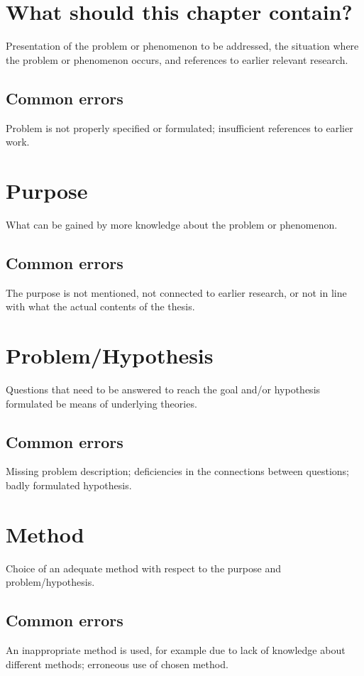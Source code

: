     \section{What should this chapter contain?}
    Presentation of the problem or phenomenon to be addressed, the situation where the problem or phenomenon occurs, and references to earlier relevant research. 
    \subsection{Common errors}
    Problem is not properly specified or formulated; insufficient references to earlier work.  
    
    \section{Purpose}
    What can be gained by more knowledge about the problem or phenomenon. 
    \subsection{Common errors}
    The purpose is not mentioned, not connected to earlier research, or not in line with what the actual contents of the thesis.  
    
    \section{Problem/Hypothesis} 
    Questions that need to be answered to reach 
    the goal and/or hypothesis formulated be means of 
    underlying theories. 
    \subsection{Common errors}
    Missing problem description; deficiencies in the connections between questions; badly formulated 
    hypothesis.  
    
    \section{Method} 
    Choice of an adequate method with respect to the 
    purpose and problem/hypothesis. 
    
    \subsection{Common errors}
    An inappropriate method is used, for example due to lack of knowledge about different methods; 
    erroneous use of chosen method.  
\fi